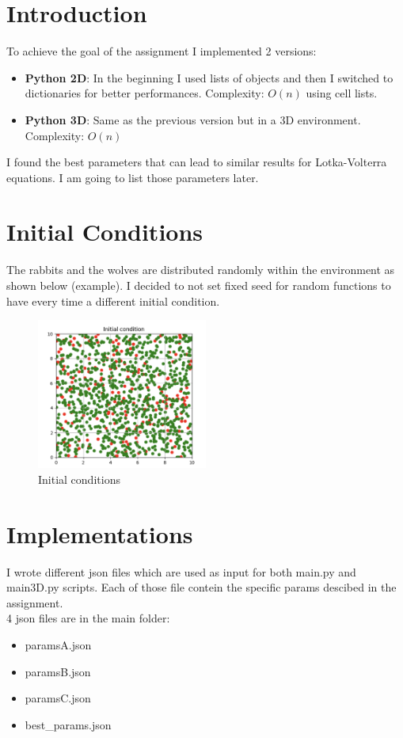 \documentclass[unicode,11pt,a4paper,oneside,numbers=endperiod,openany]{scrartcl}
\begin{document}
\setassignment

\newline
\section*{Introduction}
To achieve the goal of the assignment I implemented 2 versions:
\begin{itemize}
  \item \textbf{Python 2D}: In the beginning I used lists of objects and then I switched to dictionaries for better performances. Complexity: $O(n)$ using cell lists. 
  \item \textbf{Python 3D}: Same as the previous version but in a 3D environment. Complexity: $O(n)$
\end{itemize}
I found the best parameters that can lead to similar results for Lotka-Volterra equations. I am going to list those parameters later. \\

\section*{Initial Conditions}
The rabbits and the wolves are distributed randomly within the environment as shown below (example). I decided to not set fixed seed for random functions
to have every time a different initial condition.
\begin{figure}[H]
  \centering
  \includegraphics[width=0.5\textwidth]{output_main/Initial_condition.png}
  \caption{Initial conditions}
\end{figure}
\section*{Implementations}
I wrote different json files which are used as input for both main.py and main3D.py scripts. Each of those file contein the specific params descibed in the assignment. \\
4 json files are in the main folder:
\begin{itemize}
  \item paramsA.json
  \item paramsB.json
  \item paramsC.json
  \item best\_params.json
  
\end{itemize}
\end{document}
